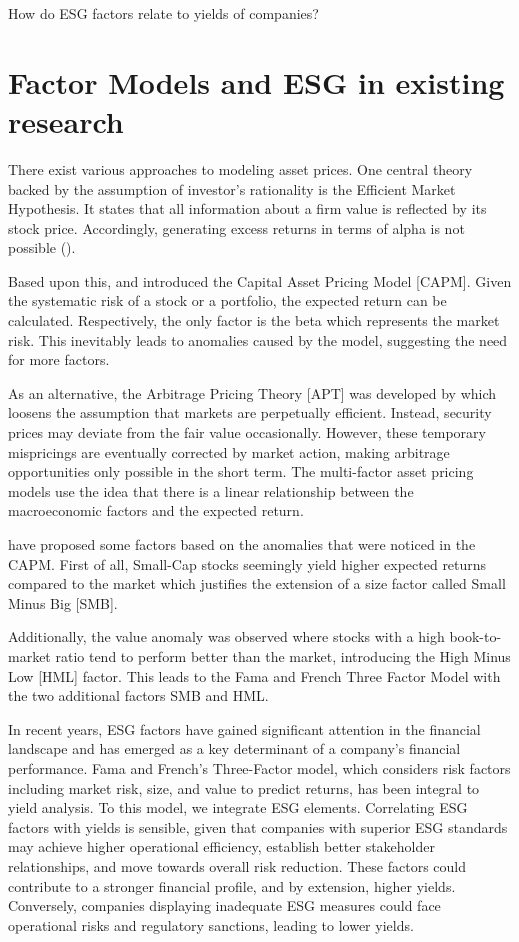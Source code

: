 \documentclass[12pt, a4paper]{article}%
\begin{document}
How do ESG factors relate to yields of companies?

%
%												   
\section{Factor Models and ESG in existing research}
There exist various approaches to modeling asset prices. One central theory backed by the assumption of investor's rationality is the Efficient Market Hypothesis. It states that all information about a firm value is reflected by its stock price. Accordingly, generating excess returns in terms of alpha is not possible (\textcite{Fama1970}). 

Based upon this, \textcite{Sharpe1964} and \textcite{Lintner1965} introduced the Capital Asset Pricing Model [CAPM]. Given the systematic risk of a stock or a portfolio, the expected return can be calculated. Respectively, the only factor is the beta which represents the market risk. This inevitably leads to anomalies caused by the model, suggesting the need for more factors.

As an alternative, the Arbitrage Pricing Theory [APT] was developed by \textcite{Ross1976} which loosens the assumption that markets are perpetually efficient. Instead, security prices may deviate from the fair value occasionally. However, these temporary mispricings are eventually corrected by market action, making arbitrage opportunities only possible in the short term.
The multi-factor asset pricing models use the idea that there is a linear relationship between the macroeconomic factors and the expected return.

\textcite{FamaFrench1992} have proposed some factors based on the anomalies that were noticed in the CAPM.
First of all, Small-Cap stocks seemingly yield higher expected returns compared to the market which justifies the extension of a size factor called Small Minus Big [SMB].

Additionally, the value anomaly was observed where stocks with a high book-to-market ratio tend to perform better than the market, introducing the High Minus Low [HML] factor.
This leads to the Fama and French Three Factor Model with the two additional factors SMB and HML.

In recent years, ESG factors have gained significant attention in the financial landscape and has emerged as a key determinant of a company’s financial performance. Fama and French's Three-Factor model, which considers risk factors including market risk, size, and value to predict returns, has been integral to yield analysis. To this model, we integrate ESG elements.
Correlating ESG factors with yields is sensible, given that companies with superior ESG standards may achieve higher operational efficiency, establish better stakeholder relationships, and move towards overall risk reduction. These factors could contribute to a stronger financial profile, and by extension, higher yields. Conversely, companies displaying inadequate ESG measures could face operational risks and regulatory sanctions, leading to lower yields.
\end{document}
